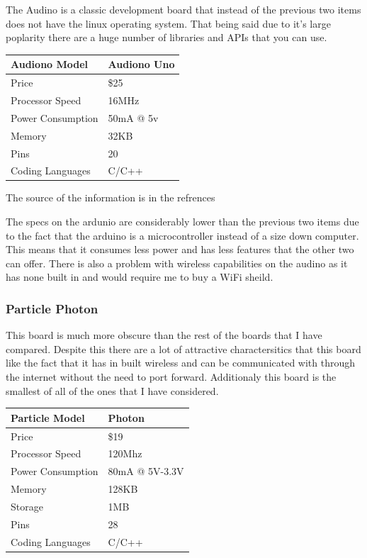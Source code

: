 \documentclass{article}
\begin{document}
The Audino is a classic development board that instead of the previous two items does not have the linux
operating system. That being said due to it's large poplarity there are a huge number of libraries and
APIs that you can use. \\

\begin{tabularx}{\textwidth}{| X | X |}
    \hline
    Audiono Model    &   Audiono Uno \\ \hline
    Price            &       \$25    \\ \hline
    Processor Speed  &      16MHz    \\ \hline
    Power Consumption&    50mA @ 5v  \\ \hline
    Memory           &      32KB     \\ \hline
    Pins             &       20      \\ \hline
    Coding Languages &     C/C++     \\ \hline
\end{tabularx}
\newline

The source of the information is in the refrences\cite{ardino}
\newline

The specs on the ardunio are considerably lower than the previous two items due to the fact that
the arduino is a microcontroller instead of a size down computer. This means that it consumes less
power and has less features that the other two can offer. There is also a problem with wireless
capabilities on the audino as it has none built in and would require me to buy a WiFi sheild.

\subsubsection{Particle Photon}

This board is much more obscure than the rest of the boards that I have compared. Despite this there
are a lot of attractive charactersitics that this board like the fact that it has in built wireless
and can be communicated with through the internet without the need to port forward. Additionaly this
board is the smallest of all of the ones that I have considered. \\

\begin{tabularx}{\textwidth}{| X | X |}
    \hline
    Particle Model   &    Photon     \\ \hline
    Price            &     \$19      \\ \hline
    Processor Speed  &    120Mhz     \\ \hline
    Power Consumption& 80mA @ 5V-3.3V\\ \hline
    Memory           &    128KB      \\ \hline
    Storage          &     1MB       \\ \hline
    Pins             &     28        \\ \hline
    Coding Languages &    C/C++      \\ \hline
\end{tabularx}
\newline
\end{document}
